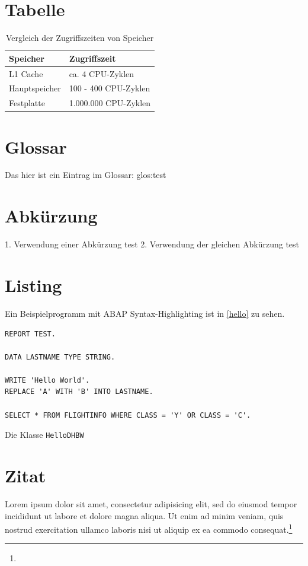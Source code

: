 \section{Tabelle}

\begin{table}[htbp]%
\centering%
\begin{tabular}{| p{3cm} | p{5cm} |}
\hline
Speicher & Zugriffszeit \\
\hline
\hline
L1 Cache & ca. 4 CPU-Zyklen  \\ \hline
Hauptspeicher & 100 - 400 CPU-Zyklen \\ \hline
Festplatte & 1.000.000 CPU-Zyklen \\ \hline
\end{tabular} 
\caption[Vergleich der Zugriffszeiten von Speicher]{Vergleich der Zugriffszeiten von Speicher\label{table:zugriff}\protect \footnotemark}
\end{table}

\section{Glossar}
Das hier ist ein Eintrag im Glossar: \gls{glos:test}

\section{Abkürzung}
1. Verwendung einer Abkürzung \gls{test}
2. Verwendung der gleichen Abkürzung \gls{test}

\section{Listing}
Ein Beispielprogramm mit ABAP Syntax-Highlighting ist in \vref{hello} zu sehen.

\begin{programm}[htbp]
\begin{lstlisting}
REPORT TEST.

DATA LASTNAME TYPE STRING.

WRITE 'Hello World'.
REPLACE 'A' WITH 'B' INTO LASTNAME.

SELECT * FROM FLIGHTINFO WHERE CLASS = 'Y' OR CLASS = 'C'.
\end{lstlisting}
\caption{Die Klasse \texttt{HelloDHBW}\label{hello}}
\end{programm}

\section{Zitat}
Lorem ipsum dolor sit amet, consectetur adipisicing elit, sed do eiusmod tempor incididunt ut labore et dolore magna aliqua. Ut enim ad minim veniam, quis nostrud exercitation ullamco laboris nisi ut aliquip ex ea commodo consequat.\footnote{ }

